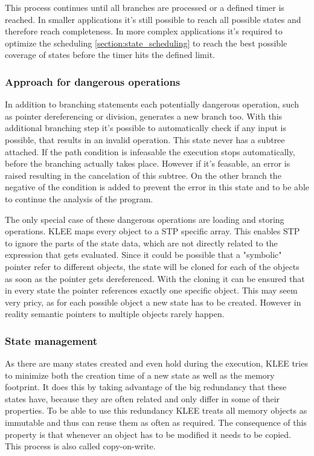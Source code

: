 This process continues until all branches are processed or a defined timer is reached. In smaller applications it's still possible to reach all possible states and therefore reach completeness. In more complex applications it's required to optimize the scheduling \ref{section:state_scheduling} to reach the best possible coverage of states before the timer hits the defined limit.
\subsubsection{Approach for dangerous operations}
In addition to branching statements each potentially dangerous operation, such as pointer dereferencing or division, generates a new branch too. With this additional branching step it's possible to automatically check if any input is possible, that results in an invalid operation. This state never has a subtree attached. If the path condition is infeasable the execution stops automatically, before the branching actually takes place. However if it's feasable, an error is raised resulting in the cancelation of this subtree. On the other branch the negative of the condition is added to prevent the error in this state and to be able to continue the analysis of the program.

The only special case of these dangerous operations are loading and storing operations. KLEE maps every object to a STP specific array. This enables STP to ignore the parts of the state data, which are not directly related to the expression that gets evaluated. Since it could be possible that a "symbolic" pointer refer to different objects, the state will be cloned for each of the objects as soon as the pointer gets dereferenced. With the cloning it can be ensured that in every state the pointer references exactly one specific object. This may seem very pricy, as for each possible object a new state has to be created. However in reality semantic pointers to multiple objects rarely happen. 

\subsubsection{State management}
As there are many states created and even hold during the execution, KLEE tries to minimize both the creation time of a new state as well as the memory footprint. It does this by taking advantage of the big redundancy that these states have, because they are often related and only differ in some of their properties. To be able to use this redundancy KLEE treats all memory objects as immutable and thus can reuse them as often as required. The consequence of this property is that whenever an object has to be modified it needs to be copied. This process is also called copy-on-write.

